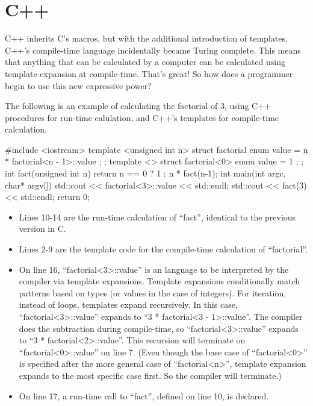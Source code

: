  \section{C++}

 C++ inherits C's macros, but with the additional introduction
 of templates, C++'s compile-time language
 incidentally became Turing complete.  This means that
 anything that can be
 calculated by a computer can be calculated using template expansion
 at compile-time.  That's great!  So how does a programmer begin to use this new
 expressive power?

 The following is an example of calculating the factorial of
 3, using C++ procedures for run-time calulation, and C++'s templates for compile-time
 calculation.

 \begin{code}
 #include <iostream>
 template <unsigned int n>
 struct factorial {
     enum { value = n * factorial<n - 1>::value };
 };
 template <>
 struct factorial<0> {
     enum { value = 1 };
 };
 int fact(unsigned int n){
   return n == 0
     ? 1
     : n * fact(n-1);
 }
 int main(int argc, char* argv[]){
   std::cout << factorial<3>::value << std::endl;
   std::cout << fact(3) << std::endl;
   return 0;
 }
 \end{code}

 \begin{itemize}
  \item
    Lines 10-14 are the run-time calculation of ``fact'', identical
    to the previous version in C.
  \item
   Lines 2-9 are the
   template code for the compile-time calculation of ``factorial''.
   \item
 On line 16, ``factorial\textless3\textgreater::value'' is an
 language to be interpreted
 by the compiler via template expansions.  Template expansions
 conditionally match patterns based on types (or values in the case
 of integers).  For iteration, instead of loops, templates expand recursively.
 In this case,  ``factorial\textless3\textgreater::value'' expands to
 ``3 * factorial\textless3 - 1\textgreater::value''.  The compiler
 does the subtraction during compile-time,
 so ``factorial\textless3\textgreater::value'' expands to
 ``3 * factorial\textless2\textgreater::value''.
 This recursion will terminate on ``factorial\textless0\textgreater::value''
 on line 7. (Even though
 the base case of ``factorial\textless0\textgreater'' is specified
 after the more general
 case of ``factorial\textless n\textgreater'', template expansion expands to the most
 specific case first.  So the compiler will terminate.)

   \item
 On line 17, a run-time call to ``fact'', defined on line 10, is declared.
 \end{itemize}

